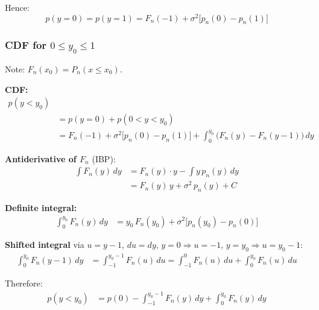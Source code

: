 Hence:
\begin{equation}
    p(y=0) = p(y=1) = F_n(-1) + \sigma^2\bigl[p_n(0) - p_n(1)\bigr]
\end{equation}


\subsubsection*{CDF for $0 \leq y_0 \leq 1$}


Note: $F_n(x_0) = P_n(x \leq x_0)$.

\textbf{CDF:}
\begin{align*}
p(y < y_0)\\
  &= p(y = 0) + p(0 < y < y_0)\\
  &= F_n(-1) + \sigma^2\bigl[p_n(0) - p_n(1)\bigr]
   + \int_0^{y_0}\bigl(F_n(y) - F_n(y-1)\bigr)\,dy
\end{align*}

\textbf{Antiderivative of $F_n$} (IBP):
\begin{align*}
\int F_n(y)\,dy
  &= F_n(y)\cdot y - \int y\,p_n(y)\,dy \\
  &= F_n(y)\,y + \sigma^2\,p_n(y) + C
\end{align*}

\textbf{Definite integral:}
\begin{align*}
\int_0^{y_0} F_n(y)\,dy
  &= y_0\,F_n(y_0) + \sigma^2\bigl[p_n(y_0) - p_n(0)\bigr]
\end{align*}

\textbf{Shifted integral} via $u = y-1$, $du = dy$, $y=0 \Rightarrow u=-1$, $y=y_0 \Rightarrow u=y_0-1$:
\begin{align*}
\int_0^{y_0} F_n(y-1)\,dy
  &= \int_{-1}^{y_0-1} F_n(u)\,du
   = \int_{-1}^{0} F_n(u)\,du + \int_0^{y_0} F_n(u)\,du
\end{align*}

Therefore:
\begin{align}
p(y < y_0) &= p(0)
   - \int_{-1}^{y_0-1} F_n(y)\,dy
   + \int_0^{y_0} F_n(y)\,dy
\end{align}

